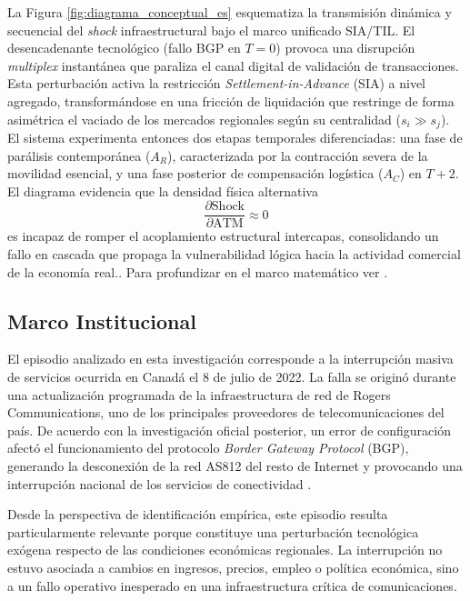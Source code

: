La Figura \ref{fig:diagrama_conceptual_es} esquematiza la transmisi\'on din\'amica y secuencial del \textit{shock} infraestructural bajo el marco unificado SIA/TIL. El desencadenante tecnol\'ogico (fallo BGP en $T=0$) provoca una disrupci\'on \textit{multiplex} instant\'anea que paraliza el canal digital de validaci\'on de transacciones. Esta perturbaci\'on activa la restricci\'on \textit{Settlement-in-Advance} (SIA) a nivel agregado, transform\'andose en una fricci\'on de liquidaci\'on que restringe de forma asim\'etrica el vaciado de los mercados regionales seg\'un su centralidad ($s_i \gg s_j$). El sistema experimenta entonces dos etapas temporales diferenciadas: una fase de par\'alisis contempor\'anea ($A_{R}$), caracterizada por la contracci\'on severa de la movilidad esencial, y una fase posterior de compensaci\'on log\'istica ($A_{C}$) en $T+2$. El diagrama evidencia que la densidad f\'isica alternativa
\begin{equation}
\frac{\partial \text{Shock}}{\partial \text{ATM}} \approx 0
\end{equation}
es incapaz de romper el acoplamiento estructural intercapas, consolidando un fallo en cascada que propaga la vulnerabilidad l\'ogica hacia la actividad comercial de la econom\'ia real.. Para profundizar en el marco matemático ver .

\subsection{Marco Institucional}

El episodio analizado en esta investigaci\'on corresponde a la interrupci\'on 
masiva de servicios ocurrida en Canad\'a el 8 de julio de 2022. La falla se 
origin\'o durante una actualizaci\'on programada de la infraestructura de red de 
Rogers Communications, uno de los principales proveedores de telecomunicaciones 
del pa\'is. De acuerdo con la investigaci\'on oficial posterior, un error de 
configuraci\'on afect\'o el funcionamiento del protocolo \textit{Border Gateway 
Protocol} (BGP), generando la desconexi\'on de la red AS812 del resto de 
Internet y provocando una interrupci\'on nacional de los servicios de 
conectividad \citep{crtc2024rogers, rogers2022q3}.

Desde la perspectiva de identificaci\'on emp\'irica, este episodio resulta 
particularmente relevante porque constituye una perturbaci\'on tecnol\'ogica 
ex\'ogena respecto de las condiciones econ\'omicas regionales. La interrupci\'on 
no estuvo asociada a cambios en ingresos, precios, empleo o pol\'itica 
econ\'omica, sino a un fallo operativo inesperado en una infraestructura 
cr\'itica de comunicaciones.


